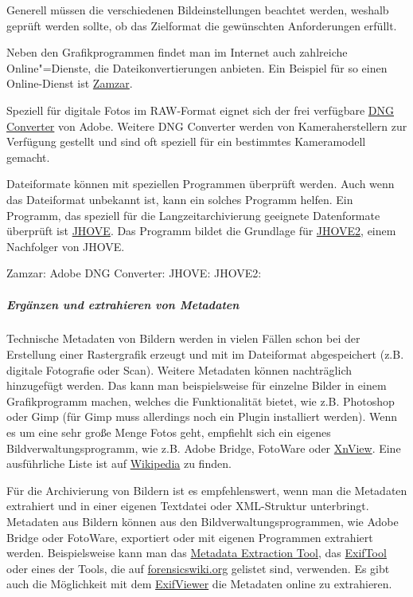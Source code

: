 Generell müssen die verschiedenen Bildeinstellungen beachtet werden, weshalb geprüft werden sollte, ob das Zielformat die gewünschten Anforderungen erfüllt.

Neben den Grafikprogrammen findet man im Internet auch zahlreiche Online"=Dienste, die Dateikonvertierungen anbieten. Ein Beispiel für so einen Online-Dienst ist \href{http://www.zamzar.com/url/}{Zamzar}.

Speziell für digitale Fotos im RAW-Format eignet sich der frei verfügbare \href{http://www.adobe.com/products/photoshop/extend.displayTab2.html#downloads}{DNG Converter} von Adobe. Weitere DNG Converter werden von Kameraherstellern zur Verfügung gestellt und sind oft speziell für ein bestimmtes Kameramodell gemacht. 

Dateiformate können mit speziellen Programmen überprüft werden. Auch wenn das Dateiformat unbekannt ist, kann ein solches Programm helfen. Ein Programm, das speziell für die Langzeitarchivierung geeignete Datenformate überprüft ist \href{http://sourceforge.net/projects/jhove/}{JHOVE}. Das Programm bildet die Grundlage für \href{https://bitbucket.org/jhove2/main/wiki/Home}{JHOVE2}, einem Nachfolger von JHOVE.

\begin{flushleft}
	Zamzar: 
	Adobe DNG Converter: 
	JHOVE:
	JHOVE2:
\end{flushleft}

\subparagraph{Ergänzen und extrahieren von Metadaten} Technische Metadaten von Bildern werden in vielen Fällen schon bei der Erstellung einer Rastergrafik erzeugt und mit im Dateiformat abgespeichert (z.B. digitale Fotografie oder Scan). Weitere Metadaten können nachträglich hinzugefügt werden. Das kann man beispielsweise für einzelne Bilder in einem Grafikprogramm machen, welches die Funktionalität bietet, wie z.B. Photoshop oder Gimp (für Gimp muss allerdings noch ein Plugin installiert werden). Wenn es um eine sehr große Menge Fotos geht, empfiehlt sich ein eigenes Bildverwaltungsprogramm, wie z.B. Adobe Bridge, FotoWare oder \href{http://www.xnview.com/}{XnView}. Eine ausführliche Liste ist auf \href{http://de.wikipedia.org/wiki/Bilderverwaltung\#Software}{Wikipedia} zu finden.

Für die Archivierung von Bildern ist es empfehlenswert, wenn man die Metadaten extrahiert und in einer eigenen Textdatei oder XML-Struktur unterbringt. Metadaten aus Bildern können aus den Bildverwaltungsprogrammen, wie Adobe Bridge oder FotoWare, exportiert oder mit eigenen Programmen extrahiert werden. Beispielsweise kann man das \href{http://meta-extractor.sourceforge.net/}{Metadata Extraction Tool}, das \href{http://www.sno.phy.queensu.ca/~phil/exiftool/}{ExifTool} oder eines der Tools, die auf \href{http://www.forensicswiki.org/wiki/Document_Metadata_Extraction\#Images}{forensicswiki.org} gelistet sind, verwenden. Es gibt auch die Möglichkeit mit dem \href{http://www.exifviewer.org/}{ExifViewer} die Metadaten online zu extrahieren.

